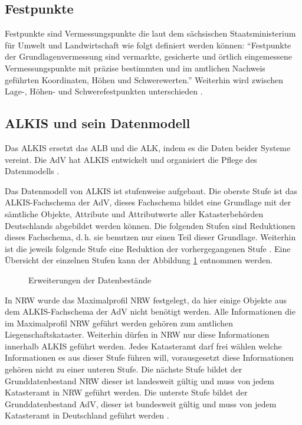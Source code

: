 \subsection{Festpunkte}
Festpunkte sind Vermessungspunkte die laut dem sächsischen Staatsministerium für Umwelt und Landwirtschaft \autocite{sachsen-festpunkt} wie folgt definiert werden können:
\enquote{Festpunkte der Grundlagenvermessung sind vermarkte, gesicherte und örtlich eingemessene Vermessungspunkte mit präzise bestimmten und im amtlichen Nachweis geführten Koordinaten, Höhen und Schwerewerten.} Weiterhin wird zwischen Lage-, Höhen- und Schwerefestpunkten unterschieden \autocite[vgl.][]{adv-festpunkte}.

\subsection{ALKIS und sein Datenmodell}
Das \acf{ALKIS} ersetzt das \acf{ALB} und die \acf{ALK}, indem es die Daten beider Systeme vereint. Die \acs{AdV} hat \acs{ALKIS} entwickelt und organisiert die Pflege des Datenmodells \autocite[vgl.][]{adv-alkis}.

Das Datenmodell von ALKIS ist stufenweise aufgebaut. Die oberste Stufe ist das ALKIS-Fachschema der AdV, dieses Fachschema bildet eine Grundlage mit der sämtliche Objekte, Attribute und Attributwerte aller Katasterbehörden Deutschlands abgebildet werden können.
Die folgenden Stufen sind Reduktionen dieses Fachschema, d.\,h. sie benutzen nur einen Teil dieser Grundlage. Weiterhin ist die jeweils folgende Stufe eine Reduktion der vorhergegangenen Stufe \autocite[vgl.][1-4]{bezk-grunddaten}. Eine Übersicht der einzelnen Stufen kann der Abbildung \ref{fig:prod-stufen} entnommen werden. 

\begin{figure}[htbp]
	\centering
	\caption{Erweiterungen der Datenbestände}
	\label{fig:prod-stufen}
\end{figure}

In \ac{NRW} wurde das Maximalprofil NRW festgelegt, da hier einige Objekte aus dem ALKIS-Fachschema der AdV nicht benötigt werden. Alle Informationen die im Maximalprofil NRW geführt werden gehören zum amtlichen Liegenschaftskataster.
Weiterhin dürfen in NRW nur diese Informationen innerhalb ALKIS geführt werden. Jedes Katasteramt darf frei wählen welche Informationen es aus dieser Stufe führen will, vorausgesetzt diese Informationen gehören nicht zu einer unteren Stufe.
Die nächste Stufe bildet der Grunddatenbestand NRW dieser ist landesweit gültig und muss von jedem Katasteramt in NRW geführt werden.
Die unterste Stufe bildet der Grunddatenbestand AdV, dieser ist bundesweit gültig und muss von jedem Katasteramt in Deutschland geführt werden \autocite[vgl.][1-4]{bezk-grunddaten}.

